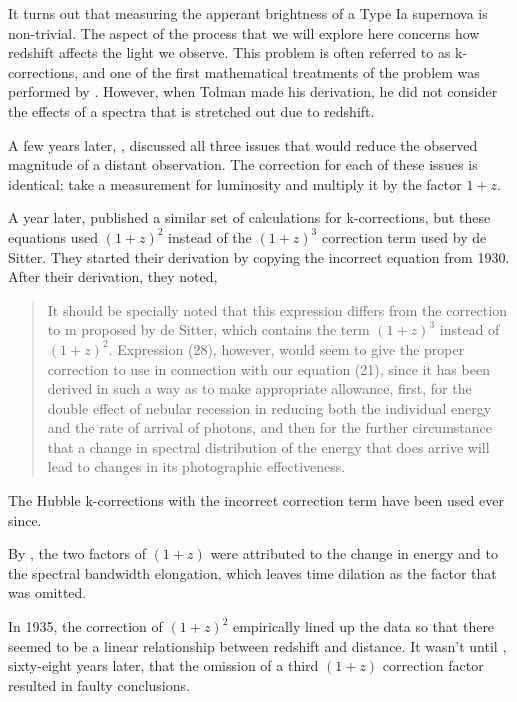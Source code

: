 \documentclass{article}
\begin{document}
It turns out that measuring the apperant brightness of a Type Ia supernova is
non-trivial. The aspect of the process that we will explore here concerns how
redshift affects the light we observe. This problem is often referred to as
k-corrections, and one of the first mathematical treatments of the problem was
performed by \citet{tolman1930}. However, when Tolman made his derivation, he
did not consider the effects of a spectra that is stretched out due to
redshift.

A few years later, \citet{desitter1934}, discussed all three issues that would
reduce the observed magnitude of a distant observation. The correction for each
of these issues is identical: take a measurement for luminosity and multiply it
by the factor $1 + z$.

A year later, \citet{hubble1935} published a similar set of calculations for
k-corrections, but these equations used $(1 + z)^2$ instead of the $(1 + z)^3$
correction term used by de Sitter. They started their derivation by copying the
incorrect equation from 1930. After their derivation, they noted,

\begin{quote}
It should be specially noted that this expression differs from the correction
to m proposed by de Sitter, which contains the term $(1 + z)^3$ instead of
$(1 + z)^2$. Expression (28), however, would seem to give the proper correction
to use in connection with our equation (21), since it has been derived in such
a way as to make appropriate allowance, first, for the double effect of nebular
recession in reducing both the individual energy and the rate of arrival of
photons, and then for the further circumstance that a change in spectral
distribution of the energy that does arrive will lead to changes in its
photographic effectiveness.
\end{quote}

The Hubble k-corrections with the incorrect correction term have been used ever
since.

By \citet{oke1968}, the two factors of $(1 + z)$ were attributed to the change
in energy and to the spectral bandwidth elongation, which leaves time dilation
as the factor that was omitted.

In 1935, the correction of $(1 + z)^2$ empirically lined up the data so that
there seemed to be a linear relationship between redshift and distance. It
wasn't until \citet{riess1998}, sixty-eight years later, that the omission of a
third $(1 + z)$ correction factor resulted in faulty conclusions.
\end{document}
